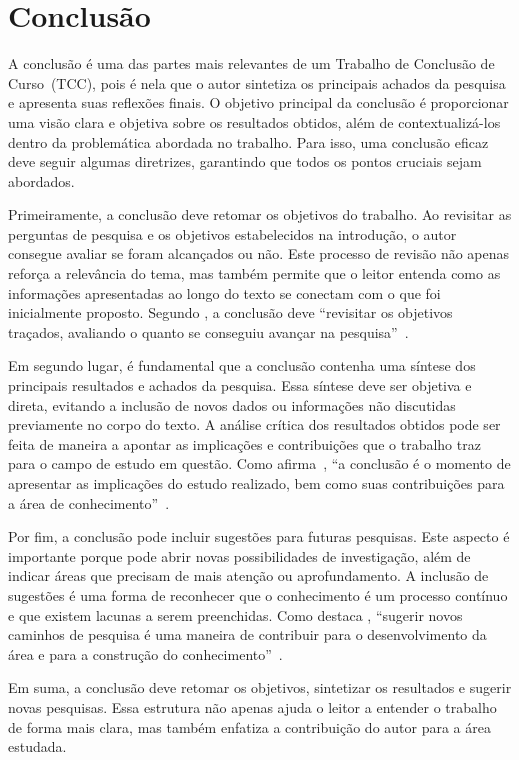 
\chapter{Conclusão}
\label{cap:conclusao}

A conclusão é uma das partes mais relevantes de um Trabalho de Conclusão de Curso~(TCC), pois é nela que o autor sintetiza os principais achados da pesquisa e apresenta suas reflexões finais. O objetivo principal da conclusão é proporcionar uma visão clara e objetiva sobre os resultados obtidos, além de contextualizá-los dentro da problemática abordada no trabalho. Para isso, uma conclusão eficaz deve seguir algumas diretrizes, garantindo que todos os pontos cruciais sejam abordados.

Primeiramente, a conclusão deve retomar os objetivos do trabalho. Ao revisitar as perguntas de pesquisa e os objetivos estabelecidos na introdução, o autor consegue avaliar se foram alcançados ou não. Este processo de revisão não apenas reforça a relevância do tema, mas também permite que o leitor entenda como as informações apresentadas ao longo do texto se conectam com o que foi inicialmente proposto. Segundo , a conclusão deve ``revisitar os objetivos traçados, avaliando o quanto se conseguiu avançar na pesquisa''~\cite{gil}.

Em segundo lugar, é fundamental que a conclusão contenha uma síntese dos principais resultados e achados da pesquisa. Essa síntese deve ser objetiva e direta, evitando a inclusão de novos dados ou informações não discutidas previamente no corpo do texto. A análise crítica dos resultados obtidos pode ser feita de maneira a apontar as implicações e contribuições que o trabalho traz para o campo de estudo em questão. Como afirma~, ``a conclusão é o momento de apresentar as implicações do estudo realizado, bem como suas contribuições para a área de conhecimento''~\cite{lakatos}.

Por fim, a conclusão pode incluir sugestões para futuras pesquisas. Este aspecto é importante porque pode abrir novas possibilidades de investigação, além de indicar áreas que precisam de mais atenção ou aprofundamento. A inclusão de sugestões é uma forma de reconhecer que o conhecimento é um processo contínuo e que existem lacunas a serem preenchidas. Como destaca , ``sugerir novos caminhos de pesquisa é uma maneira de contribuir para o desenvolvimento da área e para a construção do conhecimento''~\cite{lakatos}.

Em suma, a conclusão deve retomar os objetivos, sintetizar os resultados e sugerir novas pesquisas. Essa estrutura não apenas ajuda o leitor a entender o trabalho de forma mais clara, mas também enfatiza a contribuição do autor para a área estudada.
